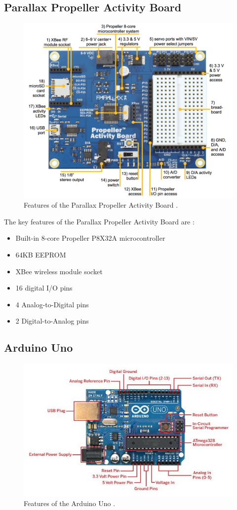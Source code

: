 \documentclass{UoYCSproject}
\begin{document}
\subsection{Parallax Propeller Activity Board} \label{parallax_specs}
\begin{figure}[h!]
  \centering
  \includegraphics[width=0.6\linewidth]{graphics/propeller_board.png}
  \caption{Features of the Parallax Propeller Activity Board \parencite{propellerspec}.}
  \label{fig:prop_board}
\end{figure}

The key features of the Parallax Propeller Activity Board are \parencite{propellerspec}:
\begin{itemize}
\item Built-in 8-core Propeller P8X32A microcontroller
\item 64KB EEPROM
\item XBee wireless module socket
\item 16 digital I/O pins
\item 4 Analog-to-Digital pins
\item 2 Digital-to-Analog pins
\end{itemize}

\subsection{Arduino Uno} \label{arduino_specs}
\begin{figure}[h!]
  \centering
  \includegraphics[width=0.8\linewidth]{graphics/arduino_board.jpg}
  \caption{Features of the Arduino Uno \parencite{arduinodiagram}.}
  \label{fig:arduino_uno}
\end{figure}
\end{document}

